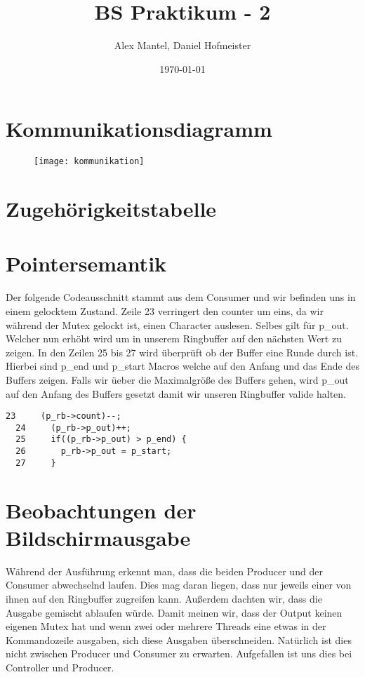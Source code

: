\documentclass[pdftex,10pt,a4paper]{article}
\begin{document}
\title{BS Praktikum - 2}
\author{Alex Mantel, Daniel Hofmeister}
\date{\today}
\maketitle
\newpage

\tableofcontents
\newpage

\section{Kommunikationsdiagramm}

\begin{figure}[ht]
  \texttt{[image: kommunikation]}
\end{figure}
\newpage

\section{Zugeh\"origkeitstabelle}


\section{Pointersemantik}
Der folgende Codeausschnitt stammt aus dem Consumer und wir befinden uns in einem gelocktem Zustand. Zeile 23 verringert den counter um eins, da wir w\"ahrend der Mutex gelockt ist, einen Character auslesen. Selbes gilt f\"ur p\_out. Welcher nun erh\"oht wird um in unserem Ringbuffer auf den n\"achsten Wert zu zeigen. In den Zeilen 25 bis 27 wird \"uberpr\"uft ob der Buffer eine Runde durch ist. Hierbei sind p\_end und p\_start Macros welche auf den Anfang und das Ende des Buffers zeigen. Falls wir \"ueber die Maximalgr\"o{\ss}e des Buffers gehen, wird p\_out auf den Anfang des Buffers gesetzt damit wir unseren Ringbuffer valide halten.

\begin{lstlisting}[frame=single] 
  23     (p_rb->count)--;
  24     (p_rb->p_out)++;
  25     if((p_rb->p_out) > p_end) {
  26       p_rb->p_out = p_start;
  27     }
\end{lstlisting}
\newpage

\section{Beobachtungen der Bildschirmausgabe}
W\"ahrend der Ausf\"uhrung erkennt man, dass die beiden Producer und der Consumer abwechselnd laufen. Dies mag daran liegen, dass nur jeweils einer von ihnen auf den Ringbuffer zugreifen kann. Au{\ss}erdem dachten wir, dass die Ausgabe gemischt ablaufen w\"urde. Damit meinen wir, dass der Output keinen eigenen Mutex hat und wenn zwei oder mehrere Threads eine etwas in der Kommandozeile ausgaben, sich diese Ausgaben \"uberschneiden. Nat\"urlich ist dies nicht zwischen Producer und Consumer zu erwarten. Aufgefallen ist uns dies bei Controller und Producer.
\end{document}
